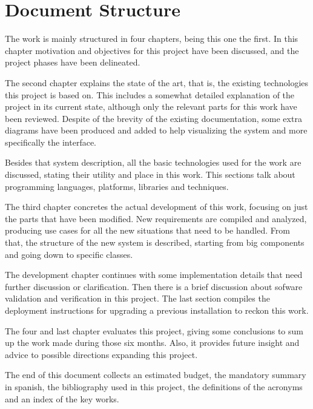 \section{Document Structure} %
\label{sec:structure}

The work is mainly structured in four chapters, being this one the first.
In this chapter motivation and objectives for this project have been discussed, and the project phases have been delineated.

The second chapter explains the state of the art, that is, the existing technologies this project is based on.
This includes a somewhat detailed explanation of the  project in its current state, although only the relevant parts for this work have been reviewed.
Despite of the brevity of the existing documentation, some extra diagrams have been produced and added to help visualizing the system and more specifically the  interface.

Besides that system description, all the basic technologies used for the work are discussed, stating their utility and place in this work.
This sections talk about programming languages, platforms, libraries and techniques.

The third chapter concretes the actual development of this work, focusing on just the parts that have been modified.
New requirements are compiled and analyzed, producing use cases for all the new situations that need to be handled.
From that, the structure of the new system is described, starting from big components and going down to specific classes.

The development chapter continues with some implementation details that need further discussion or clarification.
Then there is a brief discussion about sofware validation and verification in this project.
The last section compiles the deployment instructions for upgrading a previous  installation to reckon this work.

The four and last chapter evaluates this project, giving some conclusions to sum up the work made during those six months.
Also, it provides future insight and advice to possible directions expanding this project.

The end of this document collects an estimated budget, the mandatory summary in spanish, the bibliography used in this project, the definitions of the acronyms and an index of the key works.
